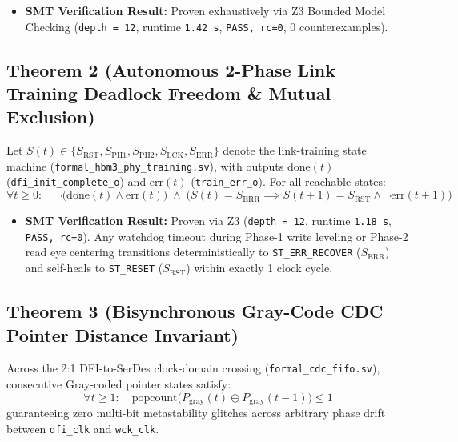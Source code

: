 \documentclass[journal,10pt,twocolumn]{IEEEtran}
\begin{document}
\begin{itemize}
  \item \textbf{SMT Verification Result:} Proven exhaustively via Z3 Bounded Model Checking (\texttt{depth = 12}, runtime \texttt{1.42 s}, \texttt{PASS, rc=0}, 0 counterexamples).
\end{itemize}

\subsection{Theorem 2 (Autonomous 2-Phase Link Training Deadlock Freedom \& Mutual Exclusion)}
Let $S(t) \in \{S_{\mathrm{RST}}, S_{\mathrm{PH1}}, S_{\mathrm{PH2}}, S_{\mathrm{LCK}}, S_{\mathrm{ERR}}\}$ denote the link-training state machine (\texttt{formal\_hbm3\_phy\_training.sv}), with outputs $\mathrm{done}(t)$ (\texttt{dfi\_init\_complete\_o}) and $\mathrm{err}(t)$ (\texttt{train\_err\_o}). For all reachable states:
$$\forall t \ge 0:\quad \neg\big(\mathrm{done}(t) \wedge \mathrm{err}(t)\big) \;\wedge\; \Big(S(t) = S_{\mathrm{ERR}} \implies S(t+1) = S_{\mathrm{RST}} \wedge \neg\mathrm{err}(t+1)\Big)$$

\begin{itemize}
  \item \textbf{SMT Verification Result:} Proven via Z3 (\texttt{depth = 12}, runtime \texttt{1.18 s}, \texttt{PASS, rc=0}). Any watchdog timeout during Phase-1 write leveling or Phase-2 read eye centering transitions deterministically to \texttt{ST\_ERR\_RECOVER} ($S_{\mathrm{ERR}}$) and self-heals to \texttt{ST\_RESET} ($S_{\mathrm{RST}}$) within exactly 1 clock cycle.
\end{itemize}

\subsection{Theorem 3 (Bisynchronous Gray-Code CDC Pointer Distance Invariant)}
Across the 2:1 DFI-to-SerDes clock-domain crossing (\texttt{formal\_cdc\_fifo.sv}), consecutive Gray-coded pointer states satisfy:
$$\forall t \ge 1:\quad \mathrm{popcount}\big(P_{\mathrm{gray}}(t) \oplus P_{\mathrm{gray}}(t-1)\big) \le 1$$
guaranteeing zero multi-bit metastability glitches across arbitrary phase drift between \texttt{dfi\_clk} and \texttt{wck\_clk}.
\end{document}
